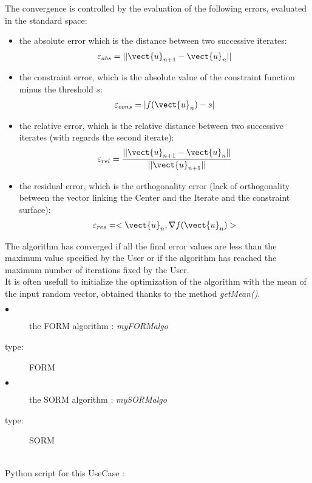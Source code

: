 The convergence is controlled by the evaluation of the following errors, evaluated in the standard space:
\begin{itemize}
 \item the absolute error which is the distance between two successive iterates:
\begin{align*}
\varepsilon_{abs} = ||\vect{u}_{n+1}-\vect{u}_n||
\end{align*}
 \item the constraint error, which is the  absolute value of the constraint function minus the threshold $s$:
\begin{align*}
\varepsilon_{cons} = |f(\vect{u}_{n})-s|
\end{align*} 
 \item the relative error, which is the relative distance between two successive iterates (with regards the second iterate): 
\begin{align*}
\displaystyle \varepsilon_{rel} = \frac{||\vect{u}_{n+1}-\vect{u}_n||}{||\vect{u}_{n+1}||}
\end{align*}
 \item the residual error, which is the orthogonality error (lack of orthogonality between the vector linking the Center and the Iterate and the constraint surface):
\begin{align*}
\displaystyle \varepsilon_{res} = <\vect{u}_{n}, \nabla f(\vect{u}_{n})>
\end{align*}
\end{itemize}
The algorithm has  converged if all the final error values are less than the maximum value specified by the User or if the algorithm has reached the maximum number of iterations fixed by the User.\\


It is often usefull to initialize the optimization of the algorithm with the mean of the input random vector, obtained thanks to the method \textit{getMean()}.\\


             {
               \begin{description}
               \item[$\bullet$] the FORM algorithm : {\itshape myFORMalgo}
               \item[type:] FORM
               \item[$\bullet$] the SORM algorithm : {\itshape mySORMalgo}
               \item[type:] SORM
               \end{description}
             }

             \textspace\\
             Python  script for this UseCase :

